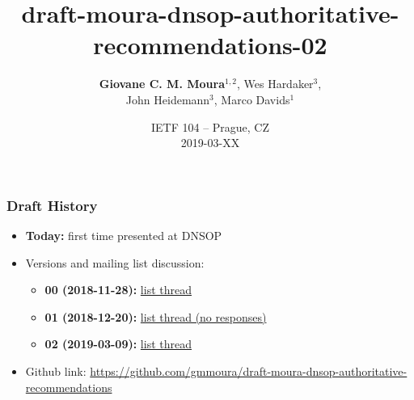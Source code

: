 \documentclass[11pt,show 
notes,notheorems,noamsthm,blank]{beamer} %
\begin{document}
\title{draft-moura-dnsop-authoritative-recommendations-02}  
\author[Moura et. al]{\textbf{Giovane C. M. Moura}$^{1,2}$, Wes Hardaker$^3$, 
\\John Heidemann$^3$, Marco Davids$^1$\\}
\vspace{-0.3cm}


   
   
\date {IETF 104 -- Prague, CZ\\
2019-03-XX\\


}  

\frame{\titlepage} 






\begin{frame}
\frametitle{Draft History}


\begin{itemize}

\item \textbf{Today:} first time presented at DNSOP 

\item Versions and mailing list discussion:

\begin{itemize}
  \item \textbf{00 (2018-11-28):}   
\href{https://mailarchive.ietf.org/arch/msg/dnsop/AMMr6dDDUmShnG90URv6AJCY_VQ}{
 list thread}

  \item \textbf{01 (2018-12-20):} 
\href{https://mailarchive.ietf.org/arch/msg/dnsop/2R8Ab4-7sKmOY7-XcJ3yLSq6Gcc}{
 list thread (no responses)} 


  \item \textbf{02 (2019-03-09):}   
\href{https://mailarchive.ietf.org/arch/msg/dnsop/}{
 list thread }
\end{itemize}

\item Github link: \small
\url{https://github.com/gmmoura/draft-moura-dnsop-authoritative-recommendations}



\end{itemize}


\end{frame}
\end{document}
